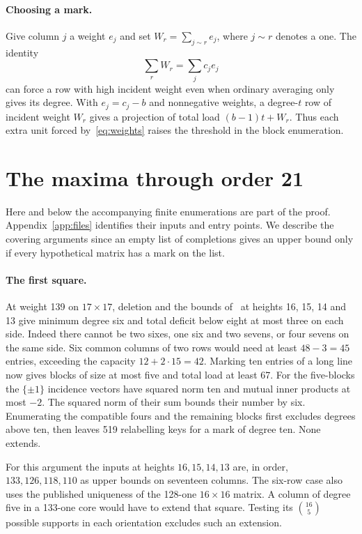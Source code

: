\documentclass[11pt]{article}
\begin{document}
\paragraph{Choosing a mark.}
Give column $j$ a weight $e_j$ and set $W_r=\sum_{j\sim r}e_j$, where
$j\sim r$ denotes a one. The identity
\begin{equation}\label{eq:weights}
\sum_r W_r=\sum_j c_j e_j
\end{equation}
can force a row with high incident weight even when ordinary averaging
only gives its degree. With $e_j=c_j-b$ and nonnegative weights, a
degree-$t$ row of incident weight $W_r$ gives a projection of total load
$(b-1)t+W_r$. Thus each extra unit forced by~\eqref{eq:weights} raises
the threshold in the block enumeration.

\section{The maxima through order 21}\label{sec:early}
Here and below the accompanying finite enumerations are part of the proof.
Appendix~\ref{app:files} identifies their inputs and entry points. We
describe the covering arguments since an empty list of completions gives
an upper bound only if every hypothetical matrix has a mark on the list.

\paragraph{The first square.}
At weight 139 on $17\times17$, deletion and the bounds of~\cite[Table~4]{crwr}
at heights 16, 15, 14 and 13 give minimum degree six and total deficit
below eight at most three on each side. Indeed there cannot be two sixes,
one six and two sevens, or four sevens on the same side. Six common
columns of two rows would need at least $48-3=45$ entries, exceeding
the capacity $12+2\cdot15=42$. Marking ten entries of a long line
now gives blocks of size at most five and total load at least 67.
For the five-blocks the $\{\pm1\}$ incidence vectors have squared norm
ten and mutual inner products at most $-2$. The squared norm of their
sum bounds their number by six. Enumerating the compatible fours and
the remaining blocks first excludes degrees above ten, then leaves
519 relabelling keys for a mark of degree ten. None extends.

For this argument the inputs at heights $16,15,14,13$ are, in order,
$133,126,118,110$ as upper bounds on seventeen columns. The six-row
case also uses the published uniqueness of the 128-one $16\times16$
matrix. A column of degree five in a 133-one core would have to extend
that square. Testing its $\binom{16}{5}$ possible supports in each
orientation excludes such an extension.
\end{document}
